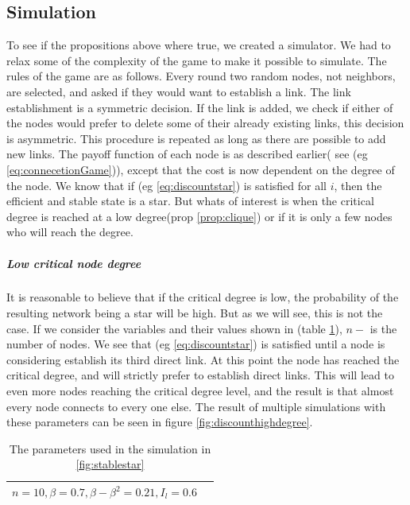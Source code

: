 \subsection{Simulation}
To see if the propositions above where true, we created a simulator. We had to relax some of the complexity of the game to make it possible to simulate. The rules of the game are as follows.
Every round two random nodes, not neighbors, are selected, and asked if they would want to establish a link. The link establishment is a symmetric decision. If the link is added, we check if either of the nodes would prefer to delete some of their already existing links, this decision is asymmetric. This procedure is repeated as long as there are possible to add new links. 
The payoff function of each node is as described earlier( see (eg \ref{eq:connecetionGame})), except that the cost is now dependent on the degree of the node.
We know that if (eg \ref{eq:discountstar}) is satisfied for all $i$, then the efficient and stable state is a star. But whats of interest is when the critical degree is reached at a low degree(prop \ref{prop:clique}) or if it is only a few nodes who will reach the degree. 
\subparagraph{Low critical node degree}
It is reasonable to believe that if the critical degree is low, the probability of the resulting network being a star will be high. But as we will see, this is not the case. If we consider the variables and their values shown in (table \ref{tbl:clique}), $n-$ is the number of nodes. We see that (eg \ref{eq:discountstar}) is satisfied until a node is considering establish its third direct link. At this point the node has reached the critical degree, and will strictly prefer to establish direct links. This will lead to even more nodes reaching the critical degree level, and the result is that almost every node connects to every one else. The result of multiple simulations with these parameters can be seen in figure \ref{fig:discounthighdegree}.
\begin{table}[h]
\centering
\begin{tabular}{lc}
 \hline
  $
  n=10,
  \beta=0.7,
  \beta-\beta^2=0.21,
  I_{l}=0.6$\\
  \hline
\end{tabular}
\caption{The parameters used in the simulation in \ref{fig:stablestar} \label{tbl:clique}}
\end{table}

